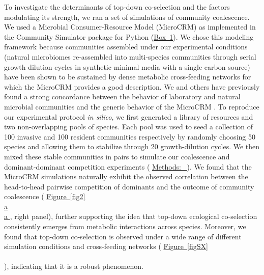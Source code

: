 \documentclass[a4paper,10pt]{article}
\newcommand{\figref}[2][]{%
  \hyperref[{#2}]{%
    Figure~\ref*{#2}%
    \ifx\\#1\\%
    \else
      #1%
    \fi
  }%
}
\newcommand{\methodsref}[1]{%
  \hyperref[{methods:#1}]{%
   Methods:~\nameref*{methods:#1}%
  }%
}
\begin{document}
To investigate the determinants of top-down co-selection and the factors modulating its strength,
we ran a set of simulations of community coalescence. We used a Microbial Consumer-Resource
Model (MicroCRM) \cite{Goldford2018,Marsland2019} as implemented in the Community Simulator package
for Python \cite{Marsland2020}
(\hyperref[box1]{Box~1}).
We chose this modeling framework because
communities assembled under our experimental conditions (natural microbiomes re-assembled into
multi-species communities through serial growth-dilution cycles in synthetic minimal media
with a single carbon source)
have been shown to be sustained by dense metabolic cross-feeding networks
\cite{Goldford2018,Estrela2020}
for which the MicroCRM provides a good description.
We and others have previously found a strong concordance between the behavior of
laboratory and natural microbial communities and the generic behavior of the MicroCRM
\cite{Goldford2018,Marsland2019,Marsland2020,Marsland2020b,Estrela2021}.
To reproduce our experimental protocol \textit{in silico},
we first generated a library of resources and two non-overlapping pools of species.
Each pool was used to seed a collection of 100 invasive
and 100 resident communities respectively
by randomly choosing 50 species and
allowing them to stabilize through 20 growth-dilution cycles.
We then mixed these stable communities in pairs to simulate our coalescence
and dominant-dominant competition experiments
(\methodsref{sim}).
We found that the MicroCRM simulations naturally exhibit the observed correlation between
the head-to-head pairwise competition of dominants
and the outcome of community coalescence
(\figref[a]{fig2}, right panel),
further supporting the idea that top-down ecological co-selection consistently
emerges from metabolic interactions across species.
Moreover, we found that top-down co-selection is observed under a wide range of different simulation conditions
and cross-feeding networks (\figref{figSX}), indicating that it is a robust phenomenon.

\clearpage
\end{document}
